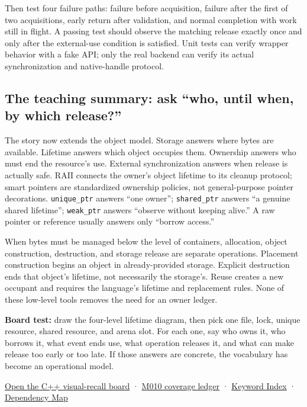 Then test four failure paths: failure before acquisition, failure after the first of two acquisitions, early return after validation, and normal completion with work still in flight. A passing test should observe the matching release exactly once and only after the external-use condition is satisfied. Unit tests can verify wrapper behavior with a fake API; only the real backend can verify its actual synchronization and native-handle protocol.

\subsection{The teaching summary: ask ``who, until when, by which release?''}\label{05-engine-i-ch004-the-teaching-summary-ask-who-until-when-by-which-release}

The story now extends the object model. Storage answers where bytes are available. Lifetime answers which object occupies them. Ownership answers who must end the resource's use. External synchronization answers when release is actually safe. RAII connects the owner's object lifetime to its cleanup protocol; smart pointers are standardized ownership policies, not general-purpose pointer decorations. \texttt{unique\_ptr} answers ``one owner''; \texttt{shared\_ptr} answers ``a genuine shared lifetime''; \texttt{weak\_ptr} answers ``observe without keeping alive.'' A raw pointer or reference usually answers only ``borrow access.''

When bytes must be managed below the level of containers, allocation, object construction, destruction, and storage release are separate operations. Placement construction begins an object in already-provided storage. Explicit destruction ends that object's lifetime, not necessarily the storage's. Reuse creates a new occupant and requires the language's lifetime and replacement rules. None of these low-level tools removes the need for an owner ledger.

\textbf{Board test:} draw the four-level lifetime diagram, then pick one file, lock, unique resource, shared resource, and arena slot. For each one, say who owns it, who borrows it, what event ends use, what operation releases it, and what can make release too early or too late. If those answers are concrete, the vocabulary has become an operational model.

\hyperref[appendix-960160274237]{Open the C++ visual-recall board} · \hyperref[appendix-fd090d982a15-m010---parts-148-160]{M010 coverage ledger} · \hyperref[appendix-a6d556a4ef50]{Keyword Index} · \hyperref[appendix-4ad47bdd269a]{Dependency Map}

